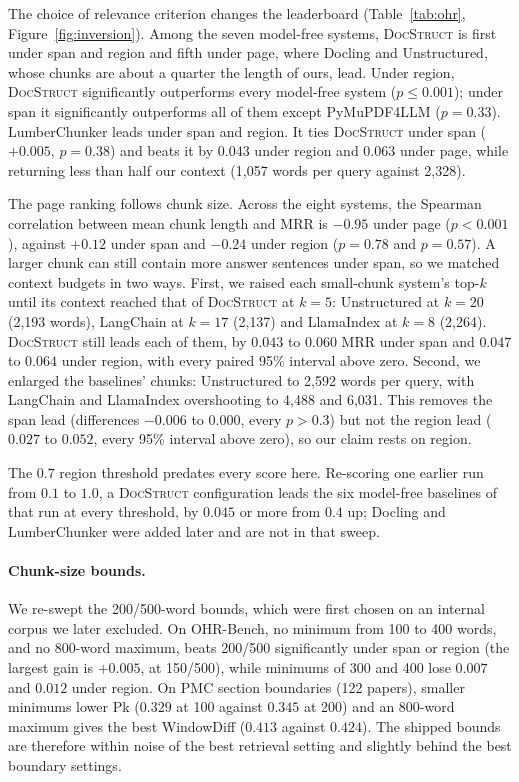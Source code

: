 \documentclass[11pt]{article}
\newcommand{\ds}{\textsc{DocStruct}}
\begin{document}
The choice of relevance criterion changes the leaderboard (Table~\ref{tab:ohr}, Figure~\ref{fig:inversion}). Among the seven model-free systems, \ds{} is first under span and region and fifth under page, where Docling and Unstructured, whose chunks are about a quarter the length of ours, lead. Under region, \ds{} significantly outperforms every model-free system ($p\le0.001$); under span it significantly outperforms all of them except PyMuPDF4LLM ($p=0.33$). LumberChunker leads under span and region. It ties \ds{} under span ($+0.005$, $p=0.38$) and beats it by $0.043$ under region and $0.063$ under page, while returning less than half our context (1{,}057 words per query against 2{,}328).

The page ranking follows chunk size. Across the eight systems, the Spearman correlation between mean chunk length and MRR is $-0.95$ under page ($p<0.001$), against $+0.12$ under span and $-0.24$ under region ($p=0.78$ and $p=0.57$). A larger chunk can still contain more answer sentences under span, so we matched context budgets in two ways. First, we raised each small-chunk system's top-$k$ until its context reached that of \ds{} at $k{=}5$: Unstructured at $k{=}20$ (2{,}193 words), LangChain at $k{=}17$ (2{,}137) and LlamaIndex at $k{=}8$ (2{,}264). \ds{} still leads each of them, by $0.043$ to $0.060$ MRR under span and $0.047$ to $0.064$ under region, with every paired 95\% interval above zero. Second, we enlarged the baselines' chunks: Unstructured to 2{,}592 words per query, with LangChain and LlamaIndex overshooting to 4{,}488 and 6{,}031. This removes the span lead (differences $-0.006$ to $0.000$, every $p>0.3$) but not the region lead ($0.027$ to $0.052$, every 95\% interval above zero), so our claim rests on region.

The $0.7$ region threshold predates every score here. Re-scoring one earlier run from $0.1$ to $1.0$, a \ds{} configuration leads the six model-free baselines of that run at every threshold, by $0.045$ or more from $0.4$ up; Docling and LumberChunker were added later and are not in that sweep.

\paragraph{Chunk-size bounds.} We re-swept the 200/500-word bounds, which were first chosen on an internal corpus we later excluded. On OHR-Bench, no minimum from 100 to 400 words, and no 800-word maximum, beats 200/500 significantly under span or region (the largest gain is $+0.005$, at 150/500), while minimums of 300 and 400 lose $0.007$ and $0.012$ under region. On PMC section boundaries (122 papers), smaller minimums lower Pk ($0.329$ at 100 against $0.345$ at 200) and an 800-word maximum gives the best WindowDiff ($0.413$ against $0.424$). The shipped bounds are therefore within noise of the best retrieval setting and slightly behind the best boundary settings.
\end{document}

